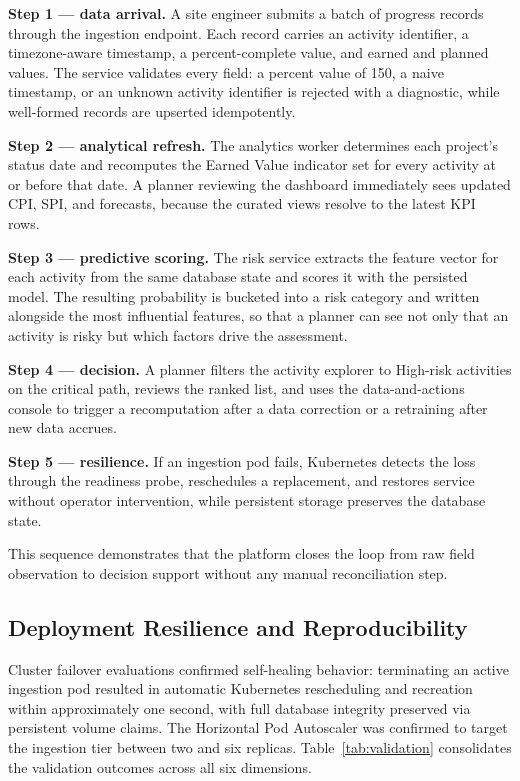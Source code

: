 \documentclass[conference]{IEEEtran}
\begin{document}
\textbf{Step 1 --- data arrival.} A site engineer submits a batch of progress records through the ingestion endpoint. Each record carries an activity identifier, a timezone-aware timestamp, a percent-complete value, and earned and planned values. The service validates every field: a percent value of 150, a naive timestamp, or an unknown activity identifier is rejected with a diagnostic, while well-formed records are upserted idempotently.

\textbf{Step 2 --- analytical refresh.} The analytics worker determines each project's status date and recomputes the Earned Value indicator set for every activity at or before that date. A planner reviewing the dashboard immediately sees updated CPI, SPI, and forecasts, because the curated views resolve to the latest KPI rows.

\textbf{Step 3 --- predictive scoring.} The risk service extracts the feature vector for each activity from the same database state and scores it with the persisted model. The resulting probability is bucketed into a risk category and written alongside the most influential features, so that a planner can see not only that an activity is risky but which factors drive the assessment.

\textbf{Step 4 --- decision.} A planner filters the activity explorer to High-risk activities on the critical path, reviews the ranked list, and uses the data-and-actions console to trigger a recomputation after a data correction or a retraining after new data accrues.

\textbf{Step 5 --- resilience.} If an ingestion pod fails, Kubernetes detects the loss through the readiness probe, reschedules a replacement, and restores service without operator intervention, while persistent storage preserves the database state.

This sequence demonstrates that the platform closes the loop from raw field observation to decision support without any manual reconciliation step.

\subsection{Deployment Resilience and Reproducibility}

Cluster failover evaluations confirmed self-healing behavior: terminating an active ingestion pod resulted in automatic Kubernetes rescheduling and recreation within approximately one second, with full database integrity preserved via persistent volume claims. The Horizontal Pod Autoscaler was confirmed to target the ingestion tier between two and six replicas. Table~\ref{tab:validation} consolidates the validation outcomes across all six dimensions.
\end{document}
